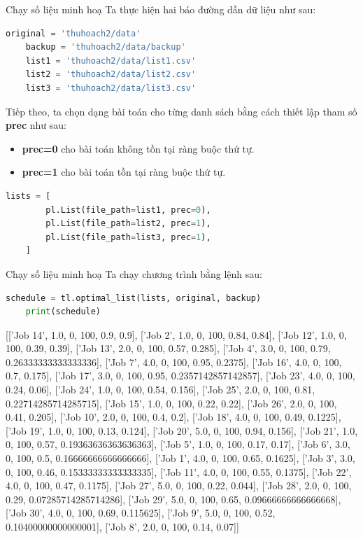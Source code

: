 \documentclass[10pt]{beamer}
\begin{document}
\begin{frame}[fragile]{Chạy số liệu minh hoạ}
Ta thực hiện hai báo đường dẫn dữ liệu như sau:
\begin{lstlisting}[language=Python]
    original = 'thuhoach2/data'
    backup = 'thuhoach2/data/backup'
    list1 = 'thuhoach2/data/list1.csv'
    list2 = 'thuhoach2/data/list2.csv'
    list3 = 'thuhoach2/data/list3.csv'
\end{lstlisting}
Tiếp theo, ta chọn dạng bài toán cho từng danh sách bằng cách thiết lập tham số \textbf{prec} như sau:
    
\begin{itemize}
\item \textbf{prec=0} cho bài toán không tồn tại ràng buộc thứ tự.
\item \textbf{prec=1} cho bài toán tồn tại ràng buộc thứ tự.
\end{itemize}

\begin{lstlisting}[language=Python]
    lists = [
        pl.List(file_path=list1, prec=0),
        pl.List(file_path=list2, prec=1),
        pl.List(file_path=list3, prec=1),
    ]
\end{lstlisting}

\end{frame}

\begin{frame}[fragile]{Chạy số liệu minh hoạ}
Ta chạy chương trình bằng lệnh sau:
\begin{lstlisting}[language=Python]
    schedule = tl.optimal_list(lists, original, backup)
    print(schedule)
\end{lstlisting}

{\scriptsize [['Job 14', 1.0, 0, 100, 0.9, 0.9], ['Job 2', 1.0, 0, 100, 0.84, 0.84], ['Job 12', 1.0, 0, 100, 0.39, 0.39], ['Job 13', 2.0, 0, 100, 0.57, 0.285], ['Job 4', 3.0, 0, 100, 0.79, 0.26333333333333336], ['Job 7', 4.0, 0, 100, 0.95, 0.2375], ['Job 16', 4.0, 0, 100, 0.7, 0.175], ['Job 17', 3.0, 0, 100, 0.95, 0.2357142857142857], ['Job 23', 4.0, 0, 100, 0.24, 0.06], ['Job 24', 1.0, 0, 100, 0.54, 0.156], ['Job 25', 2.0, 0, 100, 0.81, 0.22714285714285715], ['Job 15', 1.0, 0, 100, 0.22, 0.22], ['Job 26', 2.0, 0, 100, 0.41, 0.205], ['Job 10', 2.0, 0, 100, 0.4, 0.2], ['Job 18', 4.0, 0, 100, 0.49, 0.1225], ['Job 19', 1.0, 0, 100, 0.13, 0.124], ['Job 20', 5.0, 0, 100, 0.94, 0.156], ['Job 21', 1.0, 0, 100, 0.57, 0.19363636363636363], ['Job 5', 1.0, 0, 100, 0.17, 0.17], ['Job 6', 3.0, 0, 100, 0.5, 0.16666666666666666], ['Job 1', 4.0, 0, 100, 0.65, 0.1625], ['Job 3', 3.0, 0, 100, 0.46, 0.15333333333333335], ['Job 11', 4.0, 0, 100, 0.55, 0.1375], ['Job 22', 4.0, 0, 100, 0.47, 0.1175], ['Job 27', 5.0, 0, 100, 0.22, 0.044], ['Job 28', 2.0, 0, 100, 0.29, 0.07285714285714286], ['Job 29', 5.0, 0, 100, 0.65, 0.09666666666666668], ['Job 30', 4.0, 0, 100, 0.69, 0.115625], ['Job 9', 5.0, 0, 100, 0.52, 0.10400000000000001], ['Job 8', 2.0, 0, 100, 0.14, 0.07]]}

\end{frame}
\end{document}
